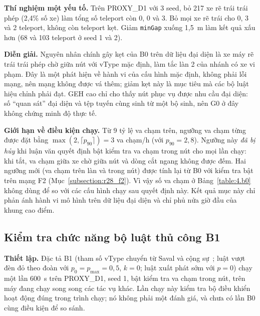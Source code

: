 \documentclass[../DoAn.tex]{subfiles}
\begin{document}
\textbf{Thí nghiệm một yếu tố.} Trên PROXY\_D1 với 3 seed, bỏ 217 xe rẽ trái trái phép (2,4\% số xe) làm tổng số teleport còn 0, 0 và 3. Bỏ mọi xe rẽ trái cho 0, 3 và 2 teleport, không còn teleport kẹt. Giảm \texttt{minGap} xuống 1,5~m làm kết quả xấu hơn (68 và 103 teleport ở seed 1 và 2).

\textbf{Diễn giải.} Nguyên nhân chính gây kẹt của B0 trên dữ liệu đại diện là xe máy rẽ trái trái phép chờ giữa nút với vType mặc định, làm tắc làn 2 của nhánh có xe vi phạm. Đây là một phát hiện về hành vi của cấu hình mặc định, không phải lỗi mạng, nên mạng không được vá thêm; giảm kẹt này là mục tiêu mà các bộ luật hiệu chỉnh phải đạt. GEH cao chỉ cho thấy nút phục vụ được nhu cầu đại diện: số ``quan sát'' đại diện và tệp tuyến cùng sinh từ một bộ sinh, nên G0 ở đây không chứng minh độ thực tế.

\textbf{Giới hạn về điều kiện chạy.} Từ 9 tỷ lệ va chạm trên, ngưỡng va chạm từng được đặt bằng $\max(2, \lceil p_{90} \rceil) = 3$ va chạm/h (với $p_{90} = 2{,}8$). Ngưỡng này \emph{đã bị hủy} khi luận văn quyết định bật kiểm tra va chạm trong nút cho mọi lần chạy: khi tắt, va chạm giữa xe chờ giữa nút và dòng cắt ngang không được đếm. Hai ngưỡng mới (va chạm trên làn và trong nút) được tính lại từ B0 với kiểm tra bật trên mạng F2 (Mục~\ref{subsection:r28_f2}). Vì vậy số va chạm ở Bảng~\ref{table:4.b0} không dùng để so với các cấu hình chạy sau quyết định này. Kết quả mục này chỉ phản ánh hành vi mô hình trên dữ liệu đại diện và chỉ phủ nửa giờ đầu của khung cao điểm.

\subsection{Kiểm tra chức năng bộ luật thủ công B1}
\label{subsection:b1_check}

\textbf{Thiết lập.} Đặc tả B1 (tham số vType chuyển từ Saval và cộng sự~\cite{saval2023mixed}; luật vượt đèn đỏ theo đoàn với $p_0 = p_{\max} = 0{,}5$, $k = 0$; luật xuất phát sớm với $p = 0$) chạy một lần 600~s trên PROXY\_D1, seed 1, bật kiểm tra va chạm trong nút, trên máy đang chạy song song các tác vụ khác. Lần chạy này kiểm tra bộ điều khiển hoạt động đúng trong trình chạy; nó không phải một đánh giá, và chưa có lần B0 cùng điều kiện để so sánh.
\end{document}
